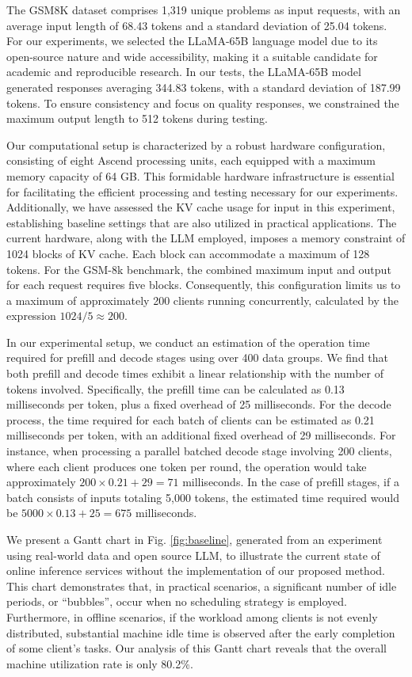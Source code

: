 The GSM8K dataset comprises 1,319 unique problems as input requests, with an average input length of 68.43 tokens and a standard deviation of 25.04 tokens. For our experiments, we selected the LLaMA-65B language model due to its open-source nature and wide accessibility, making it a suitable candidate for academic and reproducible research. In our tests, the LLaMA-65B model generated responses averaging 344.83 tokens, with a standard deviation of 187.99 tokens. To ensure consistency and focus on quality responses, we constrained the maximum output length to 512 tokens during testing.

Our computational setup is characterized by a robust hardware configuration, consisting of eight Ascend processing units, each equipped with a maximum memory capacity of 64 GB. This formidable hardware infrastructure is essential for facilitating the efficient processing and testing necessary for our experiments. Additionally, we have assessed the KV cache usage for input in this experiment, establishing baseline settings that are also utilized in practical applications. The current hardware, along with the LLM employed, imposes a memory constraint of 1024 blocks of KV cache. Each block can accommodate a maximum of 128 tokens. For the GSM-8k benchmark, the combined maximum input and output for each request requires five blocks. Consequently, this configuration limits us to a maximum of approximately 200 clients running concurrently, calculated by the expression $1024/5 \approx 200 $.

In our experimental setup, we conduct an estimation of the operation time required for prefill and decode stages using over 400 data groups. We find that both prefill and decode times exhibit a linear relationship with the number of tokens involved. Specifically, the prefill time can be calculated as 0.13 milliseconds per token, plus a fixed overhead of 25 milliseconds. For the decode process, the time required for each batch of clients can be estimated as 0.21 milliseconds per token, with an additional fixed overhead of 29 milliseconds. For instance, when processing a parallel batched decode stage involving 200 clients, where each client produces one token per round, the operation would take approximately $200 \times 0.21 + 29 = 71$ milliseconds. In the case of prefill stages, if a batch consists of inputs totaling 5,000 tokens, the estimated time required would be $5000 \times 0.13 + 25 = 675$ milliseconds.

We present a Gantt chart in Fig. \ref{fig:baseline}, generated from an experiment using real-world data and open source LLM, to illustrate the current state of online inference services without the implementation of our proposed method. This chart demonstrates that, in practical scenarios, a significant number of idle periods, or ``bubbles'', occur when no scheduling strategy is employed. Furthermore, in offline scenarios, if the workload among clients is not evenly distributed, substantial machine idle time is observed after the early completion of some client's tasks. Our analysis of this Gantt chart reveals that the overall machine utilization rate is only 80.2\%.

